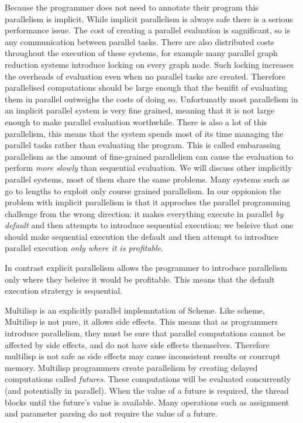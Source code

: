 Because the programmer does not need to annotate their program this
parallelism is implicit.
While implicit parallelism is always safe there is a serious performance
issue.
The cost of creating a parallel evaluation is sagnificant,
so is any communication between parallel tasks.
There are also distributed costs throughout the execution of these systems,
for example many parallel graph reduction systems introduce locking on every
graph node.
Such locking increases the overheads of evaluation even when no parallel
tasks are created.
Therefore parallelised computations should be large enough that the benifit
of evaluating them in parallel outweighs the costs of doing so.
Unfortunatly most parallelism in an implicit parallel system is very
fine grained, meaning that it is not large enough to make parallel
evaluation worthwhile.
There is also a lot of this parallelism,
this means that the system spends most of its time managing the parallel
tasks rather than evaluating the program.
This is called embarassing parallelism as the amount of fine-grained
parallelism can cause the evaluation to perform \emph{more slowly} than
sequential evaluation.
We will discuss other implicitly parallel systems,
most of them share the same problems.
Many systems such as \citet{peyton-jones:1989:parallel-graph-reduction} go
to lengths to exploit only course grained parallelism.
In our oppionion the problem with implicit parallelism is that it approches
the parallel programming challenge from the wrong direction:
it makes everything execute in parallel \emph{by default} and then attempts
to introduce sequential execution;
we beleive that one should make sequential execution the default and then
attempt to introduce parallel execution \emph{only where it is profitable}.

In contrast explicit parallelism allows the programmer to introduce
parallelism only where they beleive it would be profitable.
This means that the default execution stratergy is sequential.

Multilisp \citep{halstead:1984:multilisp,halstead:1985:multilisp} is an
explicitly parallel implemntation of Scheme.
Like scheme, Multilisp is not pure, it allows side effects.
This means that as programmers introduce parallelism, they must be sure that
parallel computations cannot be affected by side effects,
and do not have side effects themselves.
Therefore multilisp is not safe as side effects may cause inconsistent
results or courrupt memory.
Multilisp programmers create parallelism by creating delayed computations
called \emph{futures}.
These computations will be evaluated concurrently 
(and potentially in parallel).
When the value of a future is required,
the thread blocks until the future's value is available.
Many operations such as assignment and parameter parsing do not require the
value of a future.

